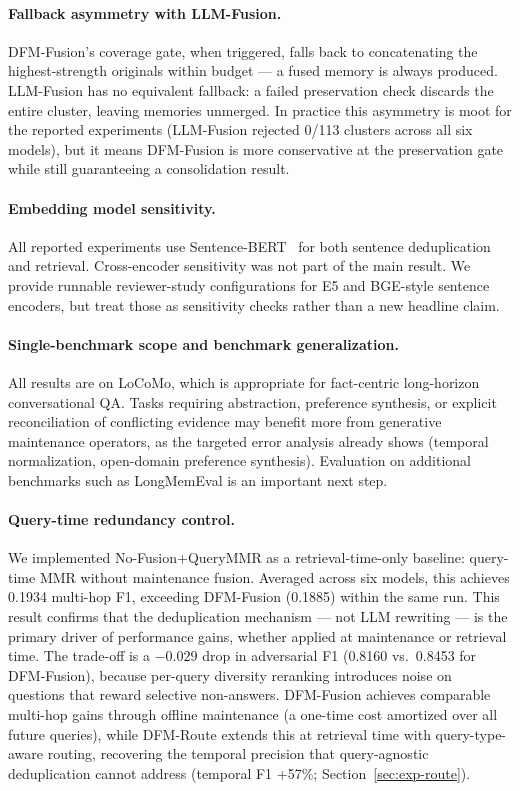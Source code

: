 \paragraph{Fallback asymmetry with LLM-Fusion.}
DFM-Fusion's coverage gate, when triggered, falls back to concatenating the highest-strength originals within budget — a fused memory is always produced. LLM-Fusion has no equivalent fallback: a failed preservation check discards the entire cluster, leaving memories unmerged. In practice this asymmetry is moot for the reported experiments (LLM-Fusion rejected 0/113 clusters across all six models), but it means DFM-Fusion is more conservative at the preservation gate while still guaranteeing a consolidation result.

\paragraph{Embedding model sensitivity.}
All reported experiments use Sentence-BERT~\citep{Reimers2019SentenceBERTSE} for both sentence deduplication and retrieval. Cross-encoder sensitivity was not part of the main result. We provide runnable reviewer-study configurations for E5 and BGE-style sentence encoders, but treat those as sensitivity checks rather than a new headline claim.

\paragraph{Single-benchmark scope and benchmark generalization.}
All results are on LoCoMo, which is appropriate for fact-centric long-horizon conversational QA. Tasks requiring abstraction, preference synthesis, or explicit reconciliation of conflicting evidence may benefit more from generative maintenance operators, as the targeted error analysis already shows (temporal normalization, open-domain preference synthesis). Evaluation on additional benchmarks such as LongMemEval is an important next step.

\paragraph{Query-time redundancy control.}
We implemented No-Fusion+QueryMMR as a retrieval-time-only baseline: query-time MMR without maintenance fusion.
Averaged across six models, this achieves 0.1934 multi-hop F1, exceeding DFM-Fusion (0.1885) within the same run.
This result confirms that the deduplication mechanism --- not LLM rewriting --- is the primary driver of performance gains, whether applied at maintenance or retrieval time.
The trade-off is a $-0.029$ drop in adversarial F1 (0.8160 vs.\ 0.8453 for DFM-Fusion), because per-query diversity reranking introduces noise on questions that reward selective non-answers.
DFM-Fusion achieves comparable multi-hop gains through offline maintenance (a one-time cost amortized over all future queries), while DFM-Route extends this at retrieval time with query-type-aware routing, recovering the temporal precision that query-agnostic deduplication cannot address (temporal F1 +57\%; Section~\ref{sec:exp-route}).

